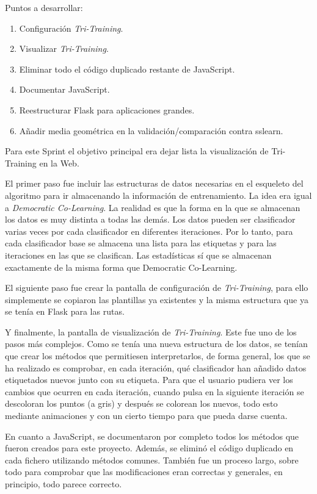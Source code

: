 Puntos a desarrollar:
\begin{enumerate}
    \item Configuración \textit{Tri-Training}.
    \item Visualizar \textit{Tri-Training}.
    \item Eliminar todo el código duplicado restante de JavaScript.
    \item Documentar JavaScript.
    \item Reestructurar Flask para aplicaciones grandes.
    \item Añadir media geométrica en la validación/comparación contra sslearn.
\end{enumerate}

Para este Sprint el objetivo principal era dejar lista la visualización de
Tri-Training en la Web. 

El primer paso fue incluir las estructuras de datos necesarias en el esqueleto
del algoritmo para ir almacenando la información de entrenamiento. La idea era
igual a \textit{Democratic Co-Learning}. La realidad es que la forma en la que
se almacenan los datos es muy distinta a todas las demás. Los datos pueden ser
clasificador varias veces por cada clasificador en diferentes iteraciones. Por
lo tanto, para cada clasificador base se almacena una lista para las etiquetas y
para las iteraciones en las que se clasifican. Las estadísticas sí que se
almacenan exactamente de la misma forma que Democratic Co-Learning.

El siguiente paso fue crear la pantalla de configuración de
\textit{Tri-Training}, para ello simplemente se copiaron las plantillas ya
existentes y la misma estructura que ya se tenía en Flask para las rutas.

Y finalmente, la pantalla de visualización de \textit{Tri-Training}. Este fue
uno de los pasos más complejos. Como se tenía una nueva estructura de los datos,
se tenían que crear los métodos que permitiesen interpretarlos, de forma
general, los que se ha realizado es comprobar, en cada iteración, qué
clasificador han añadido datos etiquetados nuevos junto con su etiqueta. Para
que el usuario pudiera ver los cambios que ocurren en cada iteración, cuando
pulsa en la siguiente iteración se descoloran los puntos (a gris) y después se
colorean los nuevos, todo esto mediante animaciones y con un cierto tiempo para
que pueda darse cuenta.

En cuanto a JavaScript, se documentaron por completo todos los métodos que
fueron creados para este proyecto. Además, se eliminó el código duplicado en
cada fichero utilizando métodos comunes. También fue un proceso largo, sobre
todo para comprobar que las modificaciones eran correctas y generales, en
principio, todo parece correcto.

